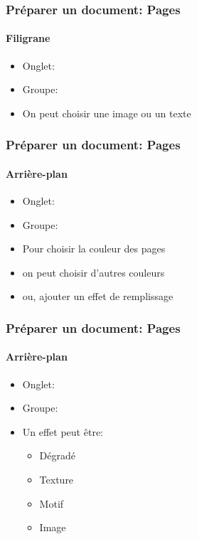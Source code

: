 \documentclass[xcolor=table]{beamer}
\begin{document}
\begin{frame}[t]
\frametitle{Préparer un document: Pages}
\framesubtitle{Filigrane}

\begin{minipage}{0.49\textwidth}
	\begin{itemize}
		\item Onglet: 
		\item Groupe: 
		\item On peut choisir une image ou un texte 
	\end{itemize}
\end{minipage}
\begin{minipage}{0.50\textwidth}
\end{minipage}

\end{frame}

\begin{frame}[t]
\frametitle{Préparer un document: Pages}
\framesubtitle{Arrière-plan}

\begin{minipage}{0.44\textwidth}
	\begin{itemize}
		\item Onglet: 
		\item Groupe: 
		\item Pour choisir la couleur des pages
		\item on peut choisir d'autres couleurs 
		\item ou, ajouter un effet de remplissage
	\end{itemize}
\end{minipage}
\begin{minipage}{0.55\textwidth}
\end{minipage}

\end{frame}

\begin{frame}[t]
\frametitle{Préparer un document: Pages}
\framesubtitle{Arrière-plan}

\begin{minipage}{0.44\textwidth}
	\begin{itemize}
		\item Onglet: 
		\item Groupe: 
		\item Un effet peut être: 
		\begin{itemize}
			\item Dégradé
			\item Texture
			\item Motif
			\item Image
		\end{itemize}
	\end{itemize}
\end{minipage}
\begin{minipage}{0.55\textwidth}
\end{minipage}

\end{frame}
\end{document}
